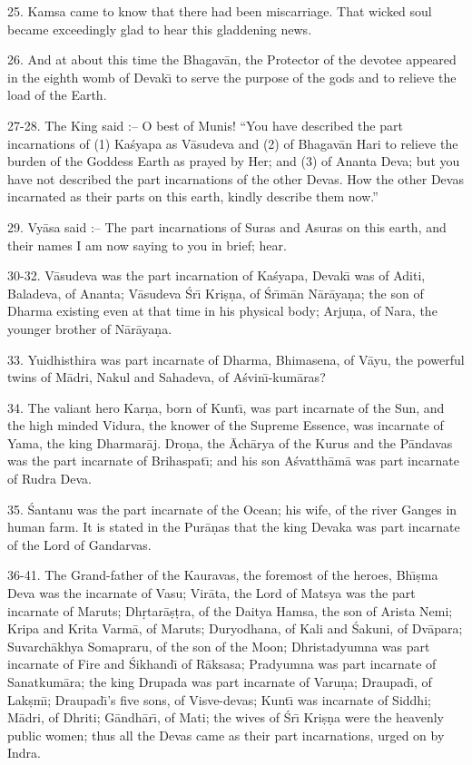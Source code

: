 25. Kamsa came to know that there had been miscarriage. That wicked soul became exceedingly glad to hear this gladdening news.

26. And at about this time the Bhagav\=an, the Protector of the devotee appeared in the eighth womb of Devak\={\i} to serve the purpose of the gods and to relieve the load of the Earth.

27-28. The King said :-- O best of Munis! ``You have described the part incarnations of (1) Ka\'syapa as V\=asudeva and (2) of Bhagav\=an Hari to relieve the burden of the Goddess Earth as prayed by Her; and (3) of Ananta Deva; but you have not described the part incarnations of the other Devas. How the other Devas incarnated as their parts on this earth, kindly describe them now.''

29. Vy\=asa said :-- The part incarnations of Suras and Asuras on this earth, and their names I am now saying to you in brief; hear.

30-32. V\=asudeva was the part incarnation of Ka\'syapa, Devak\={\i} was of Aditi, Baladeva, of Ananta; V\=asudeva \'Sr\={\i} Kri\d{s}\d{n}a, of \'Sr\={\i}m\=an N\=ar\=aya\d{n}a; the son of Dharma existing even at that time in his physical body; Arju\d{n}a, of Nara, the younger brother of N\=ar\=aya\d{n}a.

33. Yuidhisthira was part incarnate of Dharma, Bhimasena, of V\=ayu, the powerful twins of M\=adri, Nakul and Sahadeva, of A\'svin\={\i}-kum\=aras?

34. The valiant hero Kar\d{n}a, born of Kunt\={\i}, was part incarnate of the Sun, and the high minded Vidura, the knower of the Supreme Essence, was incarnate of Yama, the king Dharmar\=aj. Dro\d{n}a, the \=Ach\=arya of the Kurus and the P\=andavas was the part incarnate of Brihaspat\={\i}; and his son A\'svatth\=am\=a was part incarnate of Rudra Deva.

35. \'Santanu was the part incarnate of the Ocean; his wife, of the river Ganges in human farm. It is stated in the Pur\=a\d{n}as that the king Devaka was part incarnate of the Lord of Gandarvas.

36-41. The Grand-father of the Kauravas, the foremost of the heroes, Bh\={\i}\d{s}ma Deva was the incarnate of Vasu; Vir\=ata, the Lord of Matsya was the part incarnate of Maruts; Dh\d{r}tar\=a\d{s}\d{t}ra, of the Daitya Hamsa, the son of Arista Nemi; Kripa and Krita Varm\=a, of Maruts; Duryodhana, of Kali and \'Sakuni, of Dv\=apara; Suvarch\=akhya Somapraru, of the son of the Moon; Dhristadyumna was part incarnate of Fire and \'Sikhand\={\i} of R\=aksasa; Pradyumna was part incarnate of Sanatkum\=ara; the king Drupada was part incarnate of Varu\d{n}a; Draupad\={\i}, of Lak\d{s}m\={\i}; Draupad\={\i}'s five sons, of Visve-devas; Kunt\={\i} was incarnate of Siddhi; M\=adri, of Dhriti; G\=andh\=ar\={\i}, of Mati; the wives of \'Sr\={\i} Kri\d{s}\d{n}a were the heavenly public women; thus all the Devas came as their part incarnations, urged on by Indra.

